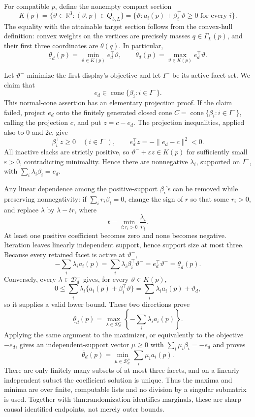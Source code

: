 For compatible \(p\), define the nonempty compact section
\[
 K(p)=\{\vartheta\in\mathbb R^3:(\vartheta,p)\in Q_{3,L}\}
     =\{\vartheta:a_i(p)+\beta_i^\top\vartheta\ge0\text{ for every }i\}.
\]
The equality with the attainable target section follows from the convex-hull definition: convex weights on the vertices are precisely masses \(q\in\Gamma_L(p)\), and their first three coordinates are \(\theta(q)\).  In particular,
\[
 \underline\theta_d(p)=\min_{\vartheta\in K(p)}e_d^\top\vartheta,
 \qquad
 \overline\theta_d(p)=\max_{\vartheta\in K(p)}e_d^\top\vartheta.
\]

Let \(\vartheta^-\) minimize the first display's objective and let \(I^-\) be its active facet set.  We claim that
\[
 e_d\in\operatorname{cone}\{\beta_i:i\in I^-\}.
\]
This normal-cone assertion has an elementary projection proof.  If the claim failed, project \(e_d\) onto the finitely generated closed cone \(C=\operatorname{cone}\{\beta_i:i\in I^-\}\), calling the projection \(c\), and put \(z=c-e_d\).  The projection inequalities, applied also to \(0\) and \(2c\), give
\[
 \beta_i^\top z\ge0\quad(i\in I^-),
 \qquad e_d^\top z=-\lVert e_d-c\rVert^2<0.
\]
All inactive slacks are strictly positive, so \(\vartheta^-+\varepsilon z\in K(p)\) for sufficiently small \(\varepsilon>0\), contradicting minimality.  Hence there are nonnegative \(\lambda_i\), supported on \(I^-\), with \(\sum_i\lambda_i\beta_i=e_d\).

Any linear dependence among the positive-support \(\beta_i\)'s can be removed while preserving nonnegativity: if \(\sum_i r_i\beta_i=0\), change the sign of \(r\) so that some \(r_i>0\), and replace \(\lambda\) by \(\lambda-t r\), where
\[
 t=\min_{i:r_i>0}\frac{\lambda_i}{r_i}.
\]
At least one positive coefficient becomes zero and none becomes negative.  Iteration leaves linearly independent support, hence support size at most three.  Because every retained facet is active at \(\vartheta^-\),
\[
 -\sum_i\lambda_i a_i(p)
 =\sum_i\lambda_i\beta_i^\top\vartheta^-
 =e_d^\top\vartheta^-
 =\underline\theta_d(p).
\]
Conversely, every \(\lambda\in\mathcal D_d^-\) gives, for every \(\vartheta\in K(p)\),
\[
 0\le\sum_i\lambda_i\{a_i(p)+\beta_i^\top\vartheta\}
   =\sum_i\lambda_i a_i(p)+\vartheta_d,
\]
so it supplies a valid lower bound.  These two directions prove
\[
 \underline\theta_d(p)=\max_{\lambda\in\mathcal D_d^-}
          \left\{-\sum_i\lambda_i a_i(p)\right\}.
\]
Applying the same argument to the maximizer, or equivalently to the objective \(-e_d\), gives an independent-support vector \(\mu\ge0\) with \(\sum_i\mu_i\beta_i=-e_d\) and proves
\[
 \overline\theta_d(p)=\min_{\mu\in\mathcal D_d^+}
          \sum_i\mu_i a_i(p).
\]
There are only finitely many subsets of at most three facets, and on a linearly independent subset the coefficient solution is unique.  Thus the maxima and minima are over finite, computable lists and no division by a singular submatrix is used.  Together with \(\text{thm:randomization-identifies-marginals}\), these are sharp causal identified endpoints, not merely outer bounds.

